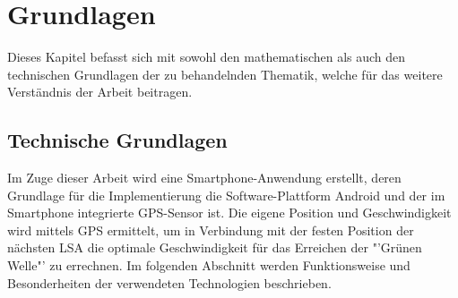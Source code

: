 \chapter{\label{chap:grundlagen}Grundlagen}
Dieses Kapitel befasst sich mit sowohl den mathematischen als auch den technischen Grundlagen der zu behandelnden Thematik, welche für das weitere Verständnis der Arbeit beitragen.
\section{\label{sec:technGrundlagen}Technische Grundlagen}
Im Zuge dieser Arbeit wird eine \gls{Smartphone}-Anwendung erstellt, deren Grundlage für die Implementierung die Software-Plattform Android und der im \gls{Smartphone} integrierte \gls{GPS}-Sensor ist. Die eigene Position und Geschwindigkeit wird mittels \gls{GPS} ermittelt, um in Verbindung mit der festen Position der nächsten \gls{LSA} die optimale Geschwindigkeit für das Erreichen der "'Grünen Welle"' zu errechnen. Im folgenden Abschnitt werden Funktionsweise und Besonderheiten der verwendeten Technologien beschrieben. 
